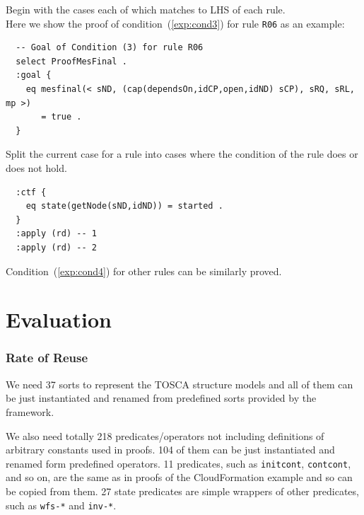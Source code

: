 \documentclass[12pt]{report}
\begin{document}
 Begin with the cases each of which matches to
LHS of each rule. \\ 
Here we show the proof of condition~(\ref{exp:cond3}) for rule {\tt R06}
as an example:
\small
\begin{verbatim}
  -- Goal of Condition (3) for rule R06
  select ProofMesFinal .
  :goal {
    eq mesfinal(< sND, (cap(dependsOn,idCP,open,idND) sCP), sRQ, sRL, mp >)
       = true .
  }
\end{verbatim}
\normalsize

 Split the current case for a rule into
cases where the condition of the rule does or does not hold. 
\small
\begin{verbatim}
  :ctf {
    eq state(getNode(sND,idND)) = started .
  }
  :apply (rd) -- 1
  :apply (rd) -- 2
\end{verbatim}
\normalsize
Condition~(\ref{exp:cond4}) for other rules can be similarly proved.

\section{Evaluation}
\label{sec:evaluation}
\subsubsection{Rate of Reuse}
We need 37 sorts to represent the TOSCA structure models and all of
them can be just instantiated and renamed from predefined sorts
provided by the framework.

We also need totally 218 predicates/operators not including
definitions of arbitrary constants used in proofs. 104 of them can be
just instantiated and renamed form predefined operators. 11
predicates, such as {\tt initcont}, {\tt contcont}, and so on, are the
same as in proofs of the CloudFormation example and so can be copied
from them.  27 state predicates are simple wrappers of other
predicates, such as {\tt wfs-*} and {\tt inv-*}.
\end{document}
